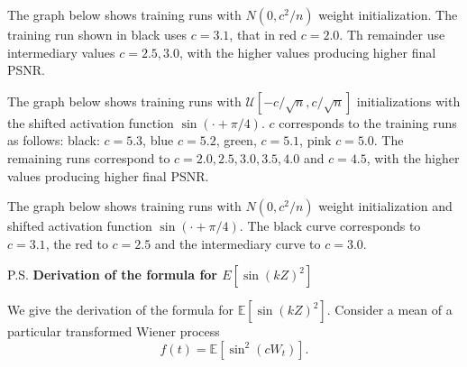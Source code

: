 \documentclass{letter}
\begin{document}
\begin{center}

\end{center}

The graph below shows training runs with $N(0,c^2/n)$ weight initialization. The training run shown in black uses $c=3.1$, that in red $c=2.0$. Th remainder use intermediary values $c=2.5, 3.0$, with the higher values producing higher final PSNR.

\begin{center}

\end{center}

The graph below shows training runs with $\mathcal{U}[-c/\sqrt{n},c/\sqrt{n}]$ initializations with the shifted activation function $\sin(\cdot+\pi/4)$. $c$ corresponds to the training runs as follows: black: $c=5.3$, blue $c=5.2$, green, $c=5.1$, pink $c=5.0$. The remaining runs correspond to $c=2.0, 2.5, 3.0, 3.5, 4.0$ and $c=4.5$, with the higher values producing higher final PSNR.

\begin{center}

\end{center}

The graph below shows training runs with $N(0,c^2/n)$ weight initialization and shifted activation function $\sin(\cdot + \pi/4)$. The black curve corresponds to $c=3.1$, the red to $c=2.5$ and the intermediary curve to $c=3.0$.

\begin{center}

\end{center}

%


{P.S. \bf Derivation of the formula for \boldmath$E[\sin(kZ)^2]$}

We give the derivation of the formula for $\mathbb{E}[\sin(kZ)^2]$. Consider a mean of a particular transformed Wiener process $$f(t)=\mathbb{E}\left[\sin^2(cW_t)\right].$$
\end{document}
